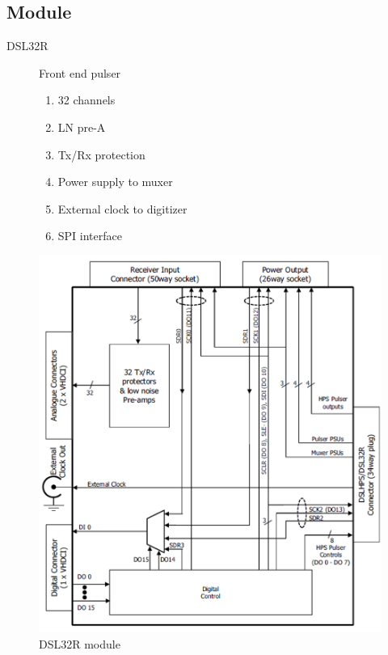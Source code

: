 \documentclass[t,12pt,english
\ifx\beamermode\undefined\else,\beamermode\fi
]{beamer}
\begin{document}
\subsection{Module}
\begin{frame}{DSL32R}

\begin{figure}[!htb]
\begin{block}{\footnotesize{Front end pulser}}\footnotesize{}
\begin{enumerate} 
\vspace{0.01cm}
     \item \footnotesize{32 channels}
     \item \footnotesize{LN pre-A}
     \item \footnotesize{Tx/Rx protection}
     \item \footnotesize{Power supply to muxer}
     \item \footnotesize{External clock to digitizer}
     \item \footnotesize{SPI interface}
\end{enumerate}
\end{block}

\endminipage
{}
\centering
\includegraphics[width=1\textwidth]{7.png}
\caption{\tiny{DSL32R module}}
\endminipage
\end{figure}

\end{frame}
\end{document}
